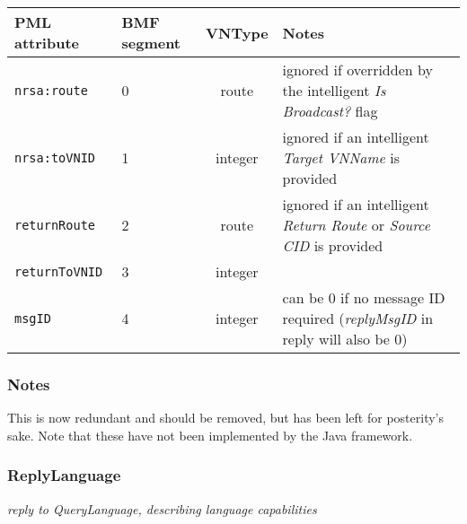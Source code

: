 \documentclass[pdftex,a4paper]{article}
\newcommand{\XMLfont}[1]{{\tt \small #1}}
\begin{document}
\begin{table}[!h]
  \begin{center}
    \label{tab:QueryCID}
    \begin{tabular}{|l|p{13mm}|c|p{60mm}|}
      \hline

      \textbf{PML attribute} & \textbf{BMF segment} & \textbf{VNType}
      & \textbf{Notes} \\\hline

      \XMLfont{nrsa:route} & 0 & route & ignored if overridden by the
      intelligent {\em Is Broadcast?} flag \\\hline

      \XMLfont{nrsa:toVNID} & 1 & integer & ignored if an intelligent {\em
      Target VNName} is provided \\\hline

      \XMLfont{returnRoute} & 2 & route & ignored if an
      intelligent {\em Return Route} or {\em Source CID} is provided
      \\\hline

      \XMLfont{returnToVNID} & 3 & integer & \\\hline

      \XMLfont{msgID} & 4 & integer & can be 0 if no message ID
      required ({\em replyMsgID} in reply will also be 0) \\\hline

    \end{tabular}
  \end{center}
\end{table}

\subsubsection*{Notes}
This is now redundant and should be removed, but has been left for posterity's
sake. Note that these have not been implemented by the Java framework.

\subsubsection{ReplyLanguage}
{\em reply to QueryLanguage, describing language capabilities}
\end{document}
